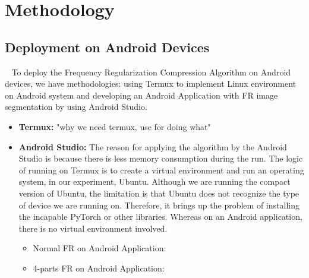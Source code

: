 \documentclass[conference]{IEEEtran}
\begin{document}
\section{Methodology}\label{methodology}
\subsection{Deployment on Android Devices}~\label{deployment}
To deploy the Frequency Regularization Compression Algorithm on Android devices, we have methodologies: using Termux to implement Linux environment on Android system and developing an Android Application with FR image segmentation by using Android Studio. 
\begin{itemize}
	\item\textbf{Termux:} "why we need termux, use for doing what"
	\item\textbf{Android Studio:} The reason for applying the algorithm by the Android Studio is because there is less memory consumption during the run. The logic of running on Termux is to create a virtual environment and run an operating system, in our experiment, Ubuntu. Although we are running the compact version of Ubuntu, the limitation is that Ubuntu does not recognize the type of device we are running on. Therefore, it brings up the problem of installing the incapable PyTorch or other libraries. Whereas on an Android application, there is no virtual environment involved. 
	\begin{itemize}
		\item Normal FR on Android Application:
		\item 4-parts FR on Android Application:
	\end{itemize}	 		
\end{itemize}	 		
\end{document}
